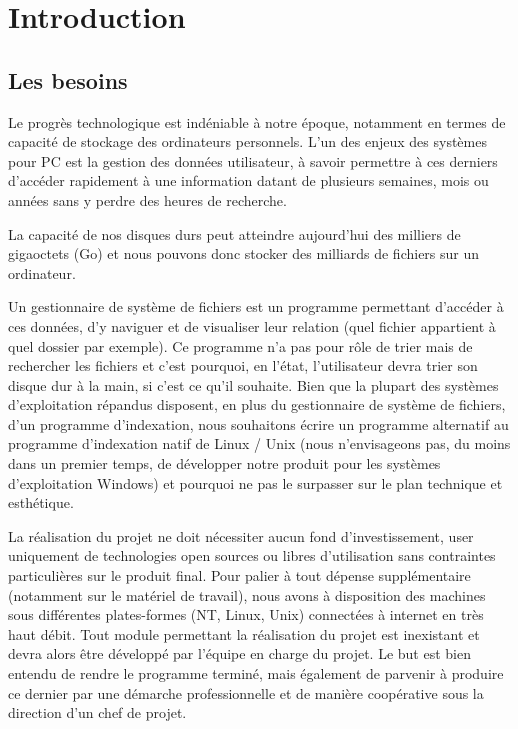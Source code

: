 \documentclass[a4paper,12pt]{report}
\begin{document}
\glsaddall
\printglossaries

\tableofcontents

\chapter{Introduction}

\section{Les besoins}
Le progrès technologique est indéniable à notre époque, notamment en termes de  capacité de stockage des ordinateurs personnels. L'un des enjeux des systèmes pour PC est la gestion des données utilisateur, à savoir permettre à ces derniers d'accéder rapidement à une information datant de plusieurs semaines, mois ou années sans y perdre des heures de recherche.

La capacité de nos disques durs peut atteindre aujourd'hui des milliers de gigaoctets (Go) et nous pouvons donc stocker des milliards de \glspl{fichier} sur un ordinateur.

Un gestionnaire de système de \glspl{fichier} est un programme permettant d'accéder à ces données, d'y naviguer et de visualiser leur relation (quel \gls{fichier} appartient à quel dossier par exemple). Ce programme n'a pas pour rôle de trier mais de rechercher les \glspl{fichier} et c'est pourquoi, en l'état, l'utilisateur devra trier son disque dur à la main, si c'est ce qu'il souhaite. Bien que la plupart des systèmes d'exploitation répandus disposent, en plus du gestionnaire de système de \glspl{fichier}, d'un programme d'indexation, nous souhaitons écrire un programme alternatif au programme d'indexation natif de Linux / Unix (nous n'envisageons pas, du moins dans un premier temps, de développer notre produit pour les systèmes d'exploitation Windows) et pourquoi ne pas le surpasser sur le plan technique et esthétique.

La réalisation du projet ne doit nécessiter aucun fond d'investissement, user uniquement de technologies open sources ou libres d'utilisation sans contraintes particulières sur le produit final. Pour palier à tout dépense supplémentaire (notamment sur le matériel de travail), nous avons à disposition des machines sous différentes plates-formes (NT, Linux, Unix) connectées à internet en très haut débit. Tout module permettant la réalisation du projet est inexistant et devra alors être développé par l'équipe en charge du projet.
Le but est bien entendu de rendre le programme terminé, mais également de parvenir à produire ce dernier par une démarche professionnelle et de manière coopérative sous la direction d'un chef de projet.
\end{document}
